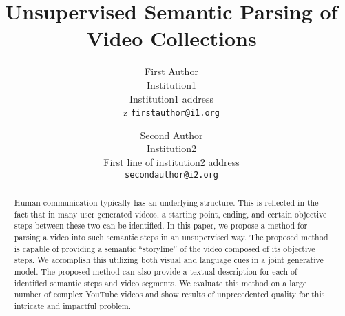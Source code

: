 \documentclass[10pt,twocolumn,letterpaper]{article}
\begin{document}
\title{Unsupervised Semantic Parsing of Video Collections}



\author{First Author\\
Institution1\\
Institution1 address\\z
{\tt\small firstauthor@i1.org}
\and
Second Author\\
Institution2\\
First line of institution2 address\\
{\tt\small secondauthor@i2.org}
}

\maketitle


\begin{abstract}
Human communication typically has an underlying structure. This is reflected in the fact that in many user generated videos, a starting point, ending, and certain objective steps between these two can be identified. In this paper, we propose a method for parsing a video into such semantic steps in an unsupervised way. The proposed method is capable of providing a semantic ``storyline'' of the video composed of its objective steps. We accomplish this utilizing both visual and language cues in a joint generative model. The proposed method can also provide a textual description for each of identified semantic steps and video segments. We evaluate this method on a large number of complex YouTube videos and show results of unprecedented quality for this intricate and impactful problem.
\end{abstract}








%

\clearpage

{\footnotesize
\begin{spacing}{0.88}


\end{spacing}
}
\end{document}
